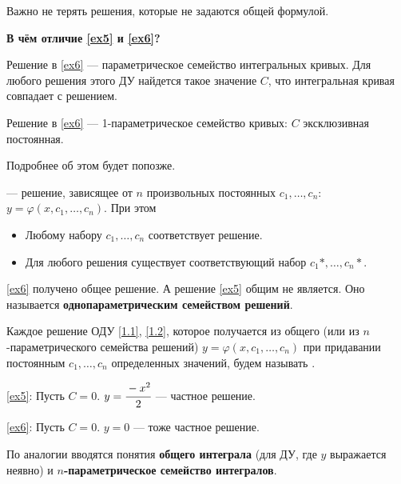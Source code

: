 Важно не терять решения, которые не задаются общей формулой.

\textbf{В чём отличие \ref{ex5} и \ref{ex6}?}

Решение в \ref{ex6} --- параметрическое семейство интегральных кривых. Для любого решения этого ДУ найдется такое значение $C$, что интегральная кривая совпадает с решением.
 
Решение в \ref{ex6} --- 1-параметрическое семейство кривых: $C$ эксклюзивная постоянная.

Подробнее об этом будет попозже.

\vspace{3mm}

\begin{Def}
 --- решение, зависящее от $n$ произвольных постоянных $c_1, \ldots, c_n$: $y = \varphi(x, c_1, \ldots, c_n)$. При этом
\begin{itemize}
    \item Любому набору $c_1, \ldots, c_n$ соответствует решение.
    \item Для любого решения существует соответствующий набор $c_1*, \ldots, c_n*$.
\end{itemize}
\end{Def}

\ref{ex6} получено общее решение. А решение \ref{ex5} общим не является. Оно называется \textbf{однопараметрическим семейством решений}.

\begin{Def}
Каждое решение ОДУ \ref{1.1}, \ref{1.2}, которое получается из общего (или из $n$-параметрического семейства решений) $y = \varphi(x, c_1, \ldots, c_n)$ при придавании постоянным $c_1, \ldots, c_n$ определенных значений, будем называть .
\end{Def}

\vspace{3mm}

\ref{ex5}: Пусть $C = 0$. $y = \cfrac{-x^2}{2}$ --- частное решение.

\ref{ex6}: Пусть $C = 0$. $y = 0$ --- тоже частное решение.

\vspace{3mm}

По аналогии вводятся понятия \textbf{общего интеграла} (для ДУ, где $y$ выражается неявно) и \textbf{$n$-параметрическое семейство интегралов}.

\vspace{5mm}

